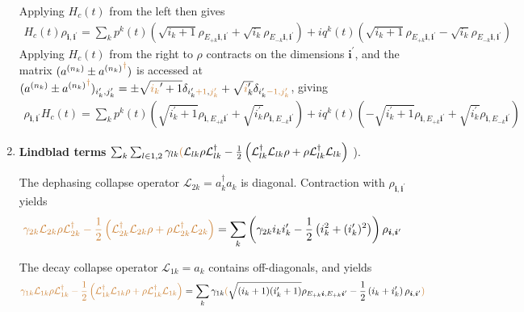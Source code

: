 \documentclass[letterpaper]{article}
\newcommand{\Ell}{\mathcal{L}}
\newcommand{\bfi}{\boldsymbol{i}}
\newcommand{\YC}[1]{{\textcolor{Bronze}{#1}}}
\begin{document}
\begin{enumerate}
      Applying $H_c(t)$ from the left then gives 
      \begin{align}
        H_c(t) \rho_{\bfi, \bfi^\prime} = \sum_k p^k(t) \left(\sqrt{i_k+1}
        \rho_{E_{+k}\bfi,\bfi^\prime} + \sqrt{i_k} \rho_{E_{-k}
        \bfi,\bfi^\prime} \right) + iq^k(t) \left(\sqrt{i_k+1}
        \rho_{E_{+k}\bfi,\bfi^\prime} - \sqrt{i_k} \rho_{E_{-k}\bfi,\bfi^\prime}
        \right)
      \end{align}
      Applying $H_c(t)$ from the right to $\rho$ contracts on the dimensions
      $\bfi^\prime$, and the matrix $(a^{(n_k)} \pm {a^{(n_k)}}^{\YC{\dagger}})$
      is accessed at $(a^{(n_k) } \pm
      {a^{(n_k)}}^{\YC{\dagger}})_{i_k^\prime,j_k^\prime} = \pm
      \sqrt{\YC{i_k}^\prime+1} \delta_{i_k^\prime\YC{+1}, \YC{j_k^\prime}} +
      \sqrt{\YC{i}_k^\prime}
      \delta_{i_k^\prime\YC{-1, j_k^\prime}}$, giving
      \begin{align}
        \rho_{\bfi, \bfi^\prime} H_c(t) = \sum_k p^k(t)
        \left(\sqrt{i_k^\prime+1} \rho_{\bfi,E_{+k}\bfi^\prime} +
        \sqrt{i_k^\prime} \rho_{\bfi,E_{-k}\bfi^\prime} \right) + iq^k(t) \left(
        - \sqrt{i_k^\prime+1} \rho_{\bfi,E_{+k}\bfi^\prime} + \sqrt{i_k^\prime}
        \rho_{\bfi,E_{-k}\bfi^\prime} \right)
      \end{align}

    \item \textbf{Lindblad terms} $\sum_k \sum_{l\in{1,2}} \gamma_{lk} \YC{(}
      \Ell_{lk} \rho \Ell_{lk}^\dag - \frac{1}{2} \left( \Ell_{lk}^\dag
      \Ell_{lk} \rho + \rho \Ell_{lk}^\dag \Ell_{lk}\right)$ \YC{)}.
    
    The dephasing collapse operator $\Ell_{2k} = a_k^\dag a_k$ is diagonal.    
    Contraction with $\rho_{\bfi,\bfi^\prime}$ yields
    \begin{align}
      \YC{\gamma_{2k}\Ell_{2k}\rho\Ell_{2k}^\dagger -\frac 12
        \left (\Ell_{2k}^\dagger\Ell_{2k}\rho +
        \rho \Ell_{2k}^\dagger\Ell_{2k} \right )} =
        \sum_k \left( \gamma_{2k} i_ki_k^\prime - \frac 12 \left( i_k^2 +
        (i_k^\prime)^2\right) \right) \rho_{\bfi,\bfi^\prime}
    \end{align}

    The decay collapse operator $\Ell_{1k} = a_k$ contains off-diagonals, and
    yields
    \begin{align}
      \YC{\gamma_{1k}\Ell_{1k}\rho\Ell_{1k}^\dagger -\frac 12
        \left (\Ell_{1k}^\dagger\Ell_{1k}\rho +
        \rho \Ell_{1k}^\dagger\Ell_{1k} \right )} =
        \sum_k \gamma_{1k} \YC{ (} \sqrt{(i_k+1)(i_k^\prime+1)}
        \rho_{E_{+k}\bfi, E_{+k}\bfi^\prime} - \frac 12 \left( i_k+ i_k^\prime
        \right)\rho_{\bfi, \bfi^\prime} \YC{ ) }
    \end{align}
      
\end{enumerate}
\end{document}
